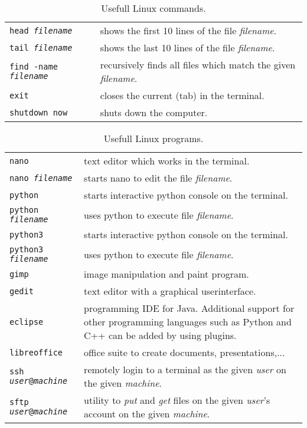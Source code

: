 \documentclass[11pt,a4paper]{article}
\begin{document}
\begin{table}[!ht]
\begin{tabular}{p{4.4cm}p{10.3cm}}
		\texttt{head \emph{filename}} & shows the first 10 lines of the file \emph{filename}.\\
		\texttt{tail \emph{filename}} & shows the last 10 lines of the file \emph{filename}.\\
		\midrule
		\texttt{find -name \emph{filename}} & recursively finds all files which match the given \emph{filename}.\\
		\midrule
		\texttt{exit} & closes the current (tab) in the terminal.\\
		\texttt{shutdown now} & shuts down the computer.\\
		\bottomrule[1pt]
	\end{tabular}
	\caption{Usefull Linux commands.}
\end{table}

\begin{table}[!ht]
	\centering
	\begin{tabular}{p{4.4cm}p{10.3cm}}
		\toprule[1pt]
		\texttt{nano} & text editor which works in the terminal.\\
		\texttt{nano \emph{filename}} & starts nano to edit the file \emph{filename}.\\
		\midrule
		\texttt{python} & starts interactive python console on the terminal.\\
		\texttt{python \emph{filename}} & uses python to execute file \emph{filename}.\\
		\texttt{python3} & starts interactive python console on the terminal.\\
		\texttt{python3 \emph{filename}} & uses python to execute file \emph{filename}.\\
		\midrule
		\texttt{gimp} & image manipulation and paint program.\\
		\texttt{gedit} & text editor with a graphical userinterface.\\
		\texttt{eclipse} & programming IDE for Java. Additional support for other programming languages such as Python and C++ can be added by using plugins.\\
		\texttt{libreoffice} & office suite to create documents, presentations,...\\
		\midrule
		\texttt{ssh \emph{user}@\emph{machine}} & remotely login to a terminal as the given \emph{user} on the given \emph{machine}.\\
		\texttt{sftp \emph{user}@\emph{machine}} & utility to \emph{put} and \emph{get} files on the given \emph{user}'s account on the given \emph{machine}.\\
		\bottomrule[1pt]
	\end{tabular}
	\caption{Usefull Linux programs.}
\end{table}%
\end{document}
